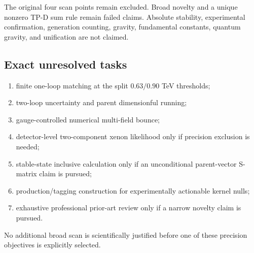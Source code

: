 \documentclass[
]{article}
\providecommand{\tightlist}{%
  \setlength{\itemsep}{0pt}\setlength{\parskip}{0pt}}
\begin{document}
The original four scan points remain excluded. Broad novelty and a
unique nonzero TP-D sum rule remain failed claims. Absolute stability,
experimental confirmation, generation counting, gravity, fundamental
constants, quantum gravity, and unification are not claimed.

\hypertarget{exact-unresolved-tasks}{%
\subsection{Exact unresolved tasks}\label{exact-unresolved-tasks}}

\begin{enumerate}
\def\labelenumi{\arabic{enumi}.}
\tightlist
\item
  finite one-loop matching at the split \(0.63/0.90\) TeV thresholds;
\item
  two-loop uncertainty and parent dimensionful running;
\item
  gauge-controlled numerical multi-field bounce;
\item
  detector-level two-component xenon likelihood only if precision
  exclusion is needed;
\item
  stable-state inclusive calculation only if an unconditional
  parent-vector S-matrix claim is pursued;
\item
  production/tagging construction for experimentally actionable kernel
  nulls;
\item
  exhaustive professional prior-art review only if a narrow novelty
  claim is pursued.
\end{enumerate}

No additional broad scan is scientifically justified before one of these
precision objectives is explicitly selected.
\end{document}

